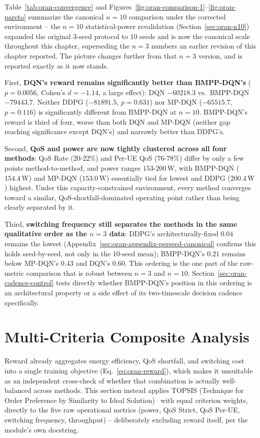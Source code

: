 Table~\ref{tab:oran-convergence} and Figures~\ref{fig:oran-comparison-1}--\ref{fig:oran-pareto}
summarize the canonical $n=10$ comparison under the corrected environment
-- the $n=10$ statistical-power revalidation
(Section~\ref{sec:oran-n10}) expanded the original 3-seed protocol to 10
seeds and is now the canonical scale throughout this chapter, superseding
the $n=3$ numbers an earlier revision of this chapter reported. The
picture changes further from that $n=3$ version, and is reported exactly
as it now stands.

First, \textbf{DQN's reward remains significantly better than BMPP-DQN's}
($p=0.0056$, Cohen's $d=-1.14$, a large effect): DQN $-60218.3$ vs.\
BMPP-DQN $-79443.7$. Neither DDPG ($-81891.5$, $p=0.631$) nor MP-DQN
($-65515.7$, $p=0.116$) is significantly different from BMPP-DQN at
$n=10$. BMPP-DQN's reward is third of four, worse than both DQN and
MP-DQN (neither gap reaching significance except DQN's) and narrowly
better than DDPG's.

Second, \textbf{QoS and power are now tightly clustered across all four
methods}: QoS Rate ($20$-$22\%$) and Per-UE QoS ($76$-$78\%$) differ by
only a few points method-to-method, and power ranges
$153$-$200\,\mathrm{W}$, with BMPP-DQN ($154.4\,\mathrm{W}$) and MP-DQN
($153.0\,\mathrm{W}$) essentially tied for lowest and DDPG
($200.4\,\mathrm{W}$) highest. Under this capacity-constrained
environment, every method converges toward a similar,
QoS-shortfall-dominated operating point rather than being clearly
separated by it.

Third, \textbf{switching frequency still separates the methods in the
same qualitative order as the $n=3$ data}: DDPG's architecturally-fixed
$0.04$ remains the lowest
(Appendix~\ref{sec:oran-appendix-perseed-canonical} confirms this holds
seed-by-seed, not only in the 10-seed mean); BMPP-DQN's $0.21$ remains
below MP-DQN's $0.43$ and DQN's $0.60$. This ordering is the one part of
the raw-metric comparison that is robust between $n=3$ and $n=10$.
Section~\ref{sec:oran-cadence-control} tests directly whether BMPP-DQN's
position in this ordering is an architectural property or a side effect
of its two-timescale decision cadence specifically.

\section{Multi-Criteria Composite Analysis}
\label{sec:oran-mcda}

Reward already aggregates energy efficiency, QoS shortfall, and switching
cost into a single training objective
(Eq.~\ref{eq:oran-reward}), which makes it unsuitable as an independent
cross-check of whether that combination is actually well-balanced across
methods. This section instead applies TOPSIS (Technique for Order
Preference by Similarity to Ideal Solution)~\cite{hwang1981topsis} with
equal criterion weights, directly to the five raw operational metrics
(power, QoS Strict, QoS Per-UE, switching frequency, throughput) --
deliberately excluding reward itself, per the module's own docstring.


